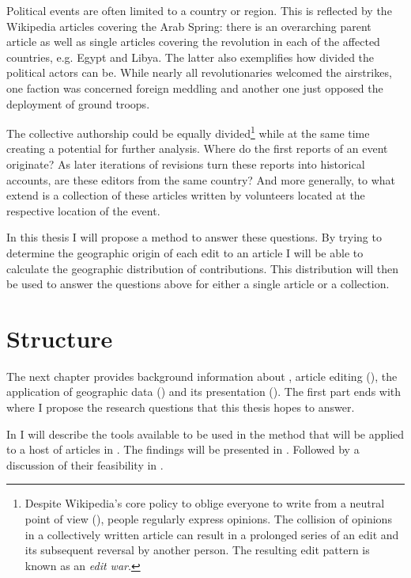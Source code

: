 Political events are often limited to a country or region. 
This is reflected by the Wikipedia articles covering the Arab Spring: there is an overarching parent article as well as single articles covering the revolution in each of the affected countries, e.g. Egypt and Libya.
The latter also exemplifies how divided the political actors can be.
While nearly all revolutionaries welcomed the airstrikes, one faction was concerned foreign meddling and another one just opposed the deployment of ground troops.\cite{econ18290470}

The collective authorship could be equally divided\footnote{Despite Wikipedia's core policy to oblige everyone to write from a neutral point of view (), people regularly express opinions. The collision of opinions in a collectively written article can result in a prolonged series of an edit and its subsequent reversal by another person. The resulting edit pattern is known as an \emph{edit war}.\cite{suh2007us}} while at the same time creating a potential for further analysis.
Where do the first reports of an event originate?
As later iterations of revisions turn these reports into historical accounts, are these editors from the same country?
And more generally, to what extend is a collection of these articles written by volunteers located at the respective location of the event.

In this thesis I will propose a method to answer these questions.
By trying to determine the geographic origin of each edit to an article I will be able to calculate the geographic distribution of contributions.
This distribution will then be used to answer the questions above for either a single article or a collection.


\section{Structure}


The next chapter  provides background information about , article editing (), the application of geographic data () and its presentation ().
The first part ends with  where I propose the research questions that this thesis hopes to answer.

In  I will describe the tools available to be used in the method that will be applied to a host of articles in .
The findings will be presented in .
Followed by a discussion of their feasibility in .